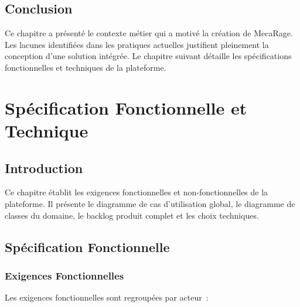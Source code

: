 \documentclass[12pt,a4paper]{report}
\begin{document}
\section{Conclusion}

Ce chapitre a présenté le contexte métier qui a motivé la création de MecaRage.
Les lacunes identifiées dans les pratiques actuelles justifient pleinement la
conception d'une solution intégrée. Le chapitre suivant détaille les spécifications
fonctionnelles et techniques de la plateforme.

\chapter{Spécification Fonctionnelle et Technique}

\section{Introduction}

Ce chapitre établit les exigences fonctionnelles et non-fonctionnelles de la
plateforme. Il présente le diagramme de cas d'utilisation global, le diagramme de
classes du domaine, le backlog produit complet et les choix techniques.

\section{Spécification Fonctionnelle}

\subsection{Exigences Fonctionnelles}

Les exigences fonctionnelles sont regroupées par acteur~:
\end{document}
